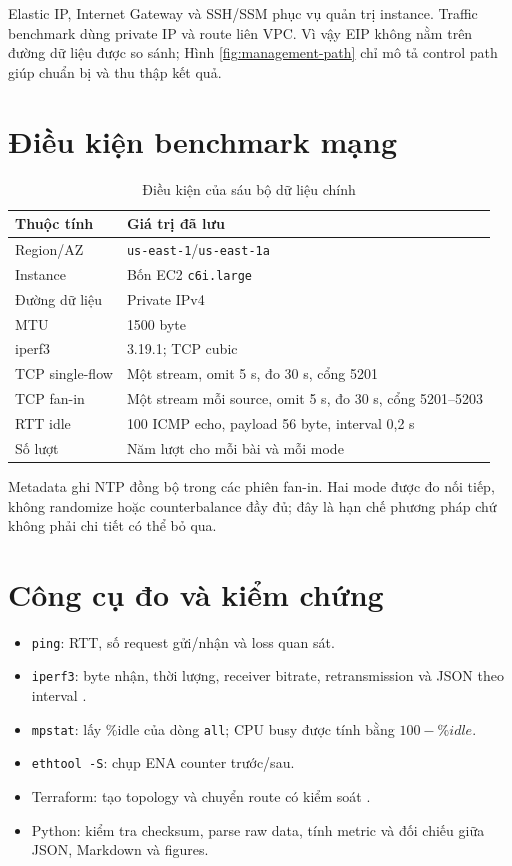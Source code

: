 Elastic IP, Internet Gateway và SSH/SSM phục vụ quản trị instance. Traffic
benchmark dùng private IP và route liên VPC. Vì vậy EIP không nằm trên đường
dữ liệu được so sánh; Hình \ref{fig:management-path} chỉ mô tả control path
giúp chuẩn bị và thu thập kết quả.

\section{Điều kiện benchmark mạng}

\begin{table}[H]
\centering
\caption{Điều kiện của sáu bộ dữ liệu chính}
\label{tab:benchmark-conditions}
\begin{tabularx}{\textwidth}{p{}X}
\toprule
\textbf{Thuộc tính} & \textbf{Giá trị đã lưu} \\
\midrule
Region/AZ & \texttt{us-east-1}/\texttt{us-east-1a} \\
Instance & Bốn EC2 \texttt{c6i.large} \\
Đường dữ liệu & Private IPv4 \\
MTU & 1500 byte \\
iperf3 & 3.19.1; TCP cubic \\
TCP single-flow & Một stream, omit 5 s, đo 30 s, cổng 5201 \\
TCP fan-in & Một stream mỗi source, omit 5 s, đo 30 s, cổng 5201--5203 \\
RTT idle & 100 ICMP echo, payload 56 byte, interval 0,2 s \\
Số lượt & Năm lượt cho mỗi bài và mỗi mode \\
\bottomrule
\end{tabularx}
\end{table}

Metadata ghi NTP đồng bộ trong các phiên fan-in. Hai mode được đo nối tiếp,
không randomize hoặc counterbalance đầy đủ; đây là hạn chế phương pháp chứ
không phải chi tiết có thể bỏ qua.

\section{Công cụ đo và kiểm chứng}

\begin{itemize}
  \item \texttt{ping}: RTT, số request gửi/nhận và loss quan sát.
  \item \texttt{iperf3}: byte nhận, thời lượng, receiver bitrate,
        retransmission và JSON theo interval \cite{iperf3-docs}.
  \item \texttt{mpstat}: lấy \%idle của dòng \texttt{all}; CPU busy được tính
        bằng $100-\%idle$.
  \item \texttt{ethtool -S}: chụp ENA counter trước/sau.
  \item Terraform: tạo topology và chuyển route có kiểm soát
        \cite{terraform-aws-provider}.
  \item Python: kiểm tra checksum, parse raw data, tính metric và đối chiếu
        giữa JSON, Markdown và figures.
\end{itemize}

